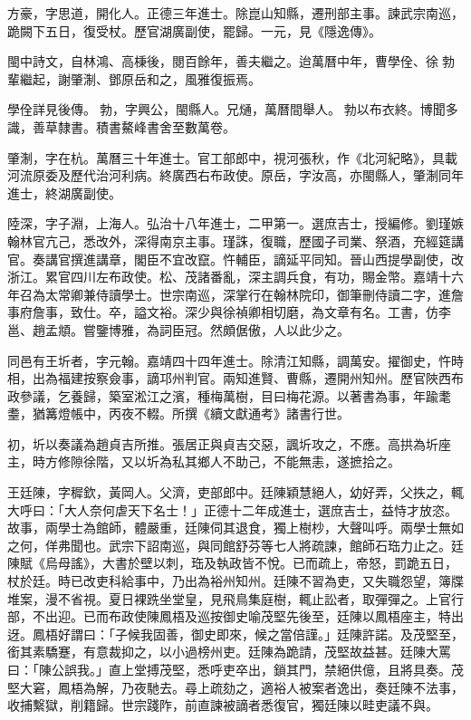 \begin{pinyinscope}
方豪，字思道，開化人。正德三年進士。除崑山知縣，遷刑部主事。諫武宗南巡，跪闕下五日，復受杖。歷官湖廣副使，罷歸。一元，見《隱逸傳》。

閩中詩文，自林鴻、高棅後，閱百餘年，善夫繼之。迨萬曆中年，曹學佺、徐勃輩繼起，謝肇淛、鄧原岳和之，風雅復振焉。

學佺詳見後傳。勃，字興公，閩縣人。兄熥，萬曆間舉人。勃以布衣終。博聞多識，善草隸書。積書鰲峰書舍至數萬卷。

肇淛，字在杭。萬曆三十年進士。官工部郎中，視河張秋，作《北河紀略》，具載河流原委及歷代治河利病。終廣西右布政使。原岳，字汝高，亦閩縣人，肇淛同年進士，終湖廣副使。

陸深，字子淵，上海人。弘治十八年進士，二甲第一。選庶吉士，授編修。劉瑾嫉翰林官亢己，悉改外，深得南京主事。瑾誅，復職，歷國子司業、祭酒，充經筵講官。奏講官撰進講章，閣臣不宜改竄。忤輔臣，謫延平同知。晉山西提學副使，改浙江。累官四川左布政使。松、茂諸番亂，深主調兵食，有功，賜金幣。嘉靖十六年召為太常卿兼侍讀學士。世宗南巡，深掌行在翰林院印，御筆刪侍讀二字，進詹事府詹事，致仕。卒，謚文裕。深少與徐禎卿相切磨，為文章有名。工書，仿李邕、趙孟頫。嘗鑒博雅，為詞臣冠。然頗倨傲，人以此少之。

同邑有王圻者，字元翰。嘉靖四十四年進士。除清江知縣，調萬安。擢御史，忤時相，出為福建按察僉事，謫邛州判官。兩知進賢、曹縣，遷開州知州。歷官陜西布政參議，乞養歸，築室淞江之濱，種梅萬樹，目曰梅花源。以著書為事，年踰耄耋，猶篝燈帳中，丙夜不輟。所撰《續文獻通考》諸書行世。

初，圻以奏議為趙貞吉所推。張居正與貞吉交惡，諷圻攻之，不應。高拱為圻座主，時方修隙徐階，又以圻為私其鄉人不助己，不能無恚，遂摭拾之。

王廷陳，字穉欽，黃岡人。父濟，吏部郎中。廷陳穎慧絕人，幼好弄，父抶之，輒大呼曰：「大人奈何虐天下名士！」正德十二年成進士，選庶吉士，益恃才放恣。故事，兩學士為館師，體嚴重，廷陳伺其退食，獨上樹杪，大聲叫呼。兩學士無如之何，佯弗聞也。武宗下詔南巡，與同館舒芬等七人將疏諫，館師石珤力止之。廷陳賦《烏母謠》，大書於壁以刺，珤及執政皆不悅。已而疏上，帝怒，罰跪五日，杖於廷。時已改吏科給事中，乃出為裕州知州。廷陳不習為吏，又失職怨望，簿牒堆案，漫不省視。夏日裸跣坐堂皇，見飛鳥集庭樹，輒止訟者，取彈彈之。上官行部，不出迎。已而布政使陳鳳梧及巡按御史喻茂堅先後至，廷陳以鳳梧座主，特出迓。鳳梧好謂曰：「子候我固善，御史即來，候之當倍謹。」廷陳許諾。及茂堅至，銜其素驕蹇，有意裁抑之，以小過榜州吏。廷陳為跪請，茂堅故益甚。廷陳大罵曰：「陳公誤我。」直上堂搏茂堅，悉呼吏卒出，鎖其門，禁絕供億，且將具奏。茂堅大窘，鳳梧為解，乃夜馳去。尋上疏劾之，適裕人被案者逸出，奏廷陳不法事，收捕繫獄，削籍歸。世宗踐阼，前直諫被謫者悉復官，獨廷陳以畦吏議不與。


\end{pinyinscope}
